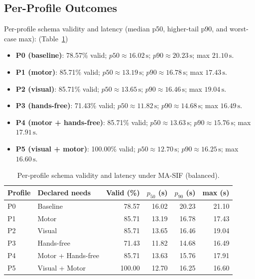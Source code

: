 \documentclass[openany]{book}
\begin{document}
\subsection{Per-Profile Outcomes}
Per-profile schema validity and latency (median p50, higher-tail p90, and worst-case max): (Table~\ref{tab:per-profile})
\begin{itemize}
    \item \textbf{P0 (baseline)}: 78.57\% valid; $p50 \approx 16.02\,\mathrm{s}$; $p90 \approx 20.23\,\mathrm{s}$; max $21.10\,\mathrm{s}$.
    \item \textbf{P1 (motor)}: 85.71\% valid; $p50 \approx 13.19\,\mathrm{s}$; $p90 \approx 16.78\,\mathrm{s}$; max $17.43\,\mathrm{s}$.
    \item \textbf{P2 (visual)}: 85.71\% valid; $p50 \approx 13.65\,\mathrm{s}$; $p90 \approx 16.46\,\mathrm{s}$; max $19.04\,\mathrm{s}$.
    \item \textbf{P3 (hands-free)}: 71.43\% valid; $p50 \approx 11.82\,\mathrm{s}$; $p90 \approx 14.68\,\mathrm{s}$; max $16.49\,\mathrm{s}$.
    \item \textbf{P4 (motor + hands-free)}: 85.71\% valid; $p50 \approx 13.63\,\mathrm{s}$; $p90 \approx 15.76\,\mathrm{s}$; max $17.91\,\mathrm{s}$.
    \item \textbf{P5 (visual + motor)}: 100.00\% valid; $p50 \approx 12.70\,\mathrm{s}$; $p90 \approx 16.25\,\mathrm{s}$; max $16.60\,\mathrm{s}$.
\end{itemize}

\begin{table}[htb]
  \centering
  \caption{Per-profile schema validity and latency under MA-SIF (balanced).}
  \label{tab:per-profile}
  \begin{tabular}{l l r r r r}
    \toprule
    \textbf{Profile} & \textbf{Declared needs} & \textbf{Valid (\%)} & \textbf{$p_{50}$ (s)} & \textbf{$p_{90}$ (s)} & \textbf{max (s)} \\
    \midrule
    P0 & Baseline & 78.57 & 16.02 & 20.23 & 21.10 \\
    P1 & Motor & 85.71 & 13.19 & 16.78 & 17.43 \\
    P2 & Visual & 85.71 & 13.65 & 16.46 & 19.04 \\
    P3 & Hands-free & 71.43 & 11.82 & 14.68 & 16.49 \\
    P4 & Motor + Hands-free & 85.71 & 13.63 & 15.76 & 17.91 \\
    P5 & Visual + Motor & 100.00 & 12.70 & 16.25 & 16.60 \\
    \bottomrule
  \end{tabular}
    \label{tab:per-profile}
\end{table}
\newpage
\end{document}
